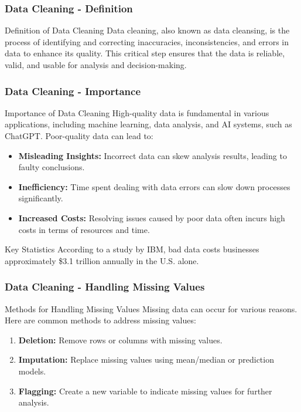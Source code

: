 \documentclass[aspectratio=169]{beamer}
\begin{document}
\begin{frame}[fragile]
    \frametitle{Data Cleaning - Definition}
    \begin{block}{Definition of Data Cleaning}
        Data cleaning, also known as data cleansing, is the process of identifying and correcting inaccuracies, inconsistencies, and errors in data to enhance its quality. This critical step ensures that the data is reliable, valid, and usable for analysis and decision-making.
    \end{block}
\end{frame}

\begin{frame}[fragile]
    \frametitle{Data Cleaning - Importance}
    \begin{block}{Importance of Data Cleaning}
        High-quality data is fundamental in various applications, including machine learning, data analysis, and AI systems, such as ChatGPT. Poor-quality data can lead to:
    \end{block}
    \begin{itemize}
        \item \textbf{Misleading Insights:} Incorrect data can skew analysis results, leading to faulty conclusions.
        \item \textbf{Inefficiency:} Time spent dealing with data errors can slow down processes significantly.
        \item \textbf{Increased Costs:} Resolving issues caused by poor data often incurs high costs in terms of resources and time.
    \end{itemize}
    \begin{block}{Key Statistics}
        According to a study by IBM, bad data costs businesses approximately \$3.1 trillion annually in the U.S. alone.
    \end{block}
\end{frame}

\begin{frame}[fragile]
    \frametitle{Data Cleaning - Handling Missing Values}
    \begin{block}{Methods for Handling Missing Values}
        Missing data can occur for various reasons. Here are common methods to address missing values:
    \end{block}
    \begin{enumerate}
        \item \textbf{Deletion:} Remove rows or columns with missing values.
        \item \textbf{Imputation:} Replace missing values using mean/median or prediction models.
        \item \textbf{Flagging:} Create a new variable to indicate missing values for further analysis.
    \end{enumerate}
\end{frame}
\end{document}
